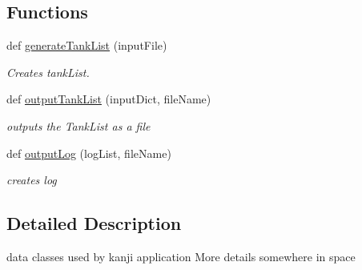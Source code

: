 \subsection*{Functions}
\begin{DoxyCompactItemize}
\item 
\mbox{\label{namespacekanji__classes_aacf3851bc889fa60014f51bff4a2deeb}} 
def \mbox{\hyperlink{namespacekanji__classes_aacf3851bc889fa60014f51bff4a2deeb}{generate\+Tank\+List}} (input\+File)
\begin{DoxyCompactList}\small\item\em Creates tank\+List. \end{DoxyCompactList}\item 
\mbox{\label{namespacekanji__classes_a9c4381a7d5d5645885ba14dc276f6aeb}} 
def \mbox{\hyperlink{namespacekanji__classes_a9c4381a7d5d5645885ba14dc276f6aeb}{output\+Tank\+List}} (input\+Dict, file\+Name)
\begin{DoxyCompactList}\small\item\em outputs the Tank\+List as a file \end{DoxyCompactList}\item 
\mbox{\label{namespacekanji__classes_aac7217822be449e4f25708824e9b6213}} 
def \mbox{\hyperlink{namespacekanji__classes_aac7217822be449e4f25708824e9b6213}{output\+Log}} (log\+List, file\+Name)
\begin{DoxyCompactList}\small\item\em creates log \end{DoxyCompactList}\end{DoxyCompactItemize}


\subsection{Detailed Description}
data classes used by kanji application More details somewhere in space 